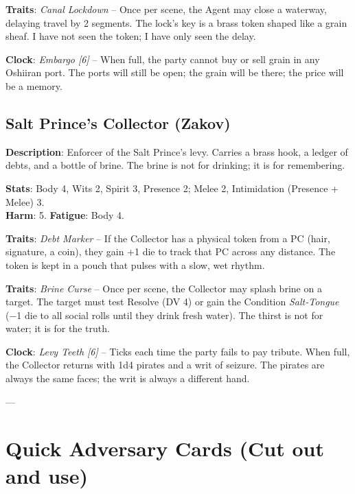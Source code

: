 \noindent\textbf{Traits}: \emph{Canal Lockdown} -- Once per scene, the Agent may close a waterway, delaying travel by 2 segments. The lock's key is a brass token shaped like a grain sheaf. I have not seen the token; I have only seen the delay.

\noindent\textbf{Clock}: \emph{Embargo [6]} -- When full, the party cannot buy or sell grain in any Oshiiran port. The ports will still be open; the grain will be there; the price will be a memory.


\subsection*{Salt Prince's Collector (Zakov)}

\noindent\textbf{Description}: Enforcer of the Salt Prince's levy. Carries a brass hook, a ledger of debts, and a bottle of brine. The brine is not for drinking; it is for remembering.

\noindent\textbf{Stats}: Body 4, Wits 2, Spirit 3, Presence 2; Melee 2, Intimidation (Presence + Melee) 3.\\
\textbf{Harm}: 5. \textbf{Fatigue}: Body 4.

\noindent\textbf{Traits}: \emph{Debt Marker} -- If the Collector has a physical token from a PC (hair, signature, a coin), they gain +1 die to track that PC across any distance. The token is kept in a pouch that pulses with a slow, wet rhythm.

\noindent\textbf{Traits}: \emph{Brine Curse} -- Once per scene, the Collector may splash brine on a target. The target must test Resolve (DV 4) or gain the Condition \emph{Salt-Tongue} (−1 die to all social rolls until they drink fresh water). The thirst is not for water; it is for the truth.

\noindent\textbf{Clock}: \emph{Levy Teeth [6]} -- Ticks each time the party fails to pay tribute. When full, the Collector returns with 1d4 pirates and a writ of seizure. The pirates are always the same faces; the writ is always a different hand.


---

\section*{Quick Adversary Cards (Cut out and use)}

